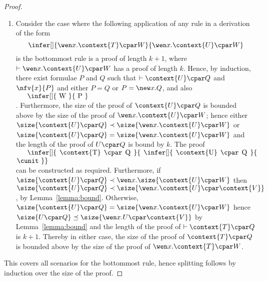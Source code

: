 \begin{proof}
\begin{enumerate}[label=\textbf{\Alph*},ref=\Alph*,leftmargin=*]
\begin{enumerate}[label*=\textbf{.\arabic*}]
{Alternatively, the bottommost rule may appear inside the context of principal formula without affecting the root connective of the principal formula. 
Consider the case where \textit{seq} is the principal formula.
Assume that the following application of any rule is the bottommost rule in a proof
$
\infer[]{
\left( \context{T} \cseq V \right) \cpar W 
}{
 \left( \context{U} \cseq V \right) \cpar W
}
$
such that $\vdash \left( \context{U} \cseq V \right) \cpar W$ has a proof of length $n$. 
Hence by induction, there exist $n$-ary killing context $\tcontext{}$ and formulae $P_i$ and $Q_i$ such that $\vdash \context{U} \cpar P_i$ and $\vdash V \cpar Q_i$ hold and have a proof no longer than $n$, for $1 \leq i \leq n$, and also 
$
\infer[]{
W
}{
 \tcontext{ P_1 \cseq Q_1, \ldots, P_n \cseq Q_n }
}
$.
Hence we can construct the following proof of length no longer than $n+1$, for all $i$, as required:
$
\infer[]{
\context{T} \cpar P_i
}{
\infer[]{
   \context{U} \cpar P_i 
}{
 \cunit
}}
$.
}

\item Consider the case where the following application of any rule in a derivation of the form 
\[
\infer[]{
\wen x. \context{T} \cpar W
}{
 \wen x. \context{U} \cpar W
}
\]
is the bottommost rule is a proof of length $k+1$, where $\vdash \wen x. \context{U} \cpar W$ has a proof of length $k$.
Hence, by induction, there exist formulae $P$ and $Q$ such that $\vdash \context{U} \cpar Q$ and $\nfv{x}{P}$ and either $P = Q$ or $P = \new x. Q$, and also
$
\vcenter{
\infer[]{
W
}{
P
}}
$.
Furthermore, the size of the proof of $\context{U} \cpar Q$ is bounded above by the size of the proof of $\wen x. \context{U} \cpar W$; hence either $\size{\context{U} \cpar Q} \prec \size{\wen x. \context{U} \cpar W}$ or $\size{\context{U} \cpar Q} = \size{\wen x. \context{U} \cpar W }$ and the length of the proof of $U \cpar Q$ is bound by $k$.
The proof 
$
\vcenter{
\infer[]{
\context{T} \cpar Q
}{
\infer[]{
 \context{U} \cpar Q 
}{
   \cunit
}}}
$ can be constructed as required.
Furthermore, if $\size{\context{U} \cpar Q} \prec \wen x. \size{\context{U} \cpar W}$ then $\size{\context{U} \cpar Q} \prec \size{\wen x. \context{U} \cpar \context{ V }}$, by Lemma~\ref{lemma:bound}. Otherwise, $\size{\context{U} \cpar Q} = \size{\wen x. \context{U} \cpar W }$
hence $\size{U \cpar Q} \preceq \size{\wen x. U \cpar \context{ V }}$ by Lemma~\ref{lemma:bound} and the length of the proof of $\vdash \context{T} \cpar Q$ is $k+1$.
Thereby in either case, the size of the proof of $\context{T} \cpar Q$ is bounded above by the size of the proof of $\wen x. \context{T} \cpar W$.
\end{enumerate}
 
\end{enumerate}

This covers all scenarios for the bottommost rule, hence splitting follows by induction over the size of the proof.
\end{proof}
